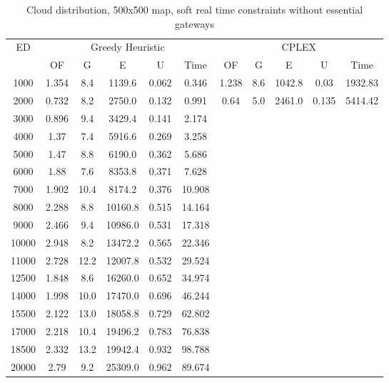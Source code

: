 \begin{table}[htb]
	\centering
	\begin{tabular}{|c|c|c|c|c|c|c|c|c|c|c|}
		\hline
		\multirow{2}{*}{ED} & \multicolumn{5}{c|}{Greedy Heuristic} & \multicolumn{5}{c|}{CPLEX}\\ 
		\cline{2-11}
& OF & G & E & U & Time & OF & G & E & U & Time\\ 
		\hline
		1000 & 1.354 & 8.4 & 1139.6 & 0.062 & 0.346 & 1.238 & 8.6 & 1042.8 & 0.03 & 1932.83 \\ 
		2000 & 0.732 & 8.2 & 2750.0 & 0.132 & 0.991 & 0.64 & 5.0 & 2461.0 & 0.135 & 5414.42 \\ 
		3000 & 0.896 & 9.4 & 3429.4 & 0.141 & 2.174 & & & & &  \\ 
		4000 & 1.37 & 7.4 & 5916.6 & 0.269 & 3.258 & & & & &  \\ 
		5000 & 1.47 & 8.8 & 6190.0 & 0.362 & 5.686 & & & & &  \\ 
		6000 & 1.88 & 7.6 & 8353.8 & 0.371 & 7.628 & & & & &  \\ 
		7000 & 1.902 & 10.4 & 8174.2 & 0.376 & 10.908 & & & & &  \\ 
		8000 & 2.288 & 8.8 & 10160.8 & 0.515 & 14.164 & & & & &  \\ 
		9000 & 2.466 & 9.4 & 10986.0 & 0.531 & 17.318 & & & & &  \\ 
		10000 & 2.948 & 8.2 & 13472.2 & 0.565 & 22.346 & & & & &  \\ 
		11000 & 2.728 & 12.2 & 12007.8 & 0.532 & 29.524 & & & & &  \\ 
		12500 & 1.848 & 8.6 & 16260.0 & 0.652 & 34.974 & & & & &  \\ 
		14000 & 1.998 & 10.0 & 17470.0 & 0.696 & 46.244 & & & & &  \\ 
		15500 & 2.122 & 13.0 & 18058.8 & 0.729 & 62.802 & & & & &  \\ 
		17000 & 2.218 & 10.4 & 19496.2 & 0.783 & 76.838 & & & & &  \\ 
		18500 & 2.332 & 13.2 & 19942.4 & 0.932 & 98.788 & & & & &  \\ 
		20000 & 2.79 & 9.2 & 25309.0 & 0.962 & 89.674 & & & & &  \\ 
		\hline 
	\end{tabular} 
	\caption{Cloud distribution, 500x500 map, soft real time constraints without essential gateways} 
	\label{tab:cloud_soft_n_esc_500} 
\end{table} 

